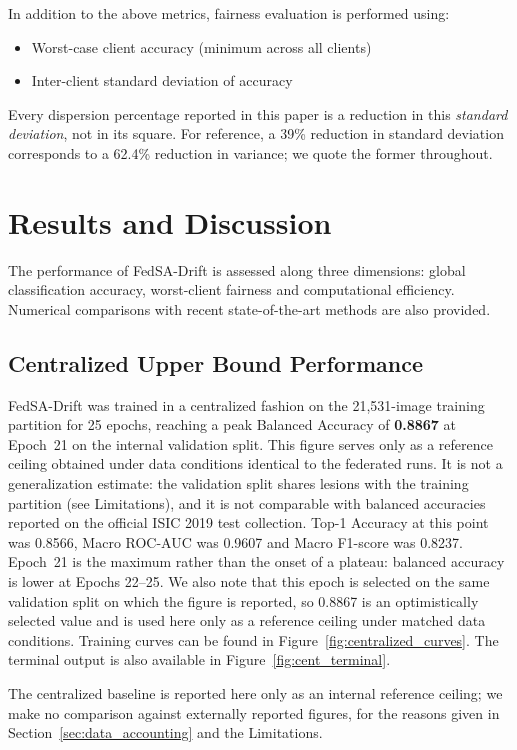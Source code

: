 \documentclass[utf8]{FrontiersinHarvard} %
\newcommand{\sadrift}{FedSA-Drift}
\begin{document}
In addition to the above metrics, fairness evaluation is performed using:
\begin{itemize}
    \item Worst-case client accuracy (minimum across all clients)
    \item Inter-client standard deviation of accuracy
\end{itemize}
Every dispersion percentage reported in this paper is a reduction in this \emph{standard deviation}, not in its square. For reference, a 39\% reduction in standard deviation corresponds to a 62.4\% reduction in variance; we quote the former throughout.

\section{Results and Discussion}

The performance of \sadrift{} is assessed along three dimensions: global classification accuracy, worst-client fairness and computational efficiency. Numerical comparisons with recent state-of-the-art methods are also provided.

\subsection{Centralized Upper Bound Performance}

\sadrift{} was trained in a centralized fashion on the 21,531-image training partition for 25 epochs, reaching a peak Balanced Accuracy of \textbf{0.8867} at Epoch~21 on the internal validation split. This figure serves only as a reference ceiling obtained under data conditions identical to the federated runs. It is not a generalization estimate: the validation split shares lesions with the training partition (see Limitations), and it is not comparable with balanced accuracies reported on the official ISIC 2019 test collection. Top-1 Accuracy at this point was 0.8566, Macro ROC-AUC was 0.9607 and Macro F1-score was 0.8237. Epoch~21 is the maximum rather than the onset of a plateau: balanced accuracy is lower at Epochs 22--25. We also note that this epoch is selected on the same validation split on which the figure is reported, so 0.8867 is an optimistically selected value and is used here only as a reference ceiling under matched data conditions. Training curves can be found in Figure~\ref{fig:centralized_curves}. The terminal output is also available in Figure~\ref{fig:cent_terminal}.

The centralized baseline is reported here only as an internal reference ceiling; we make no comparison against externally reported figures, for the reasons given in Section~\ref{sec:data_accounting} and the Limitations.
\end{document}
